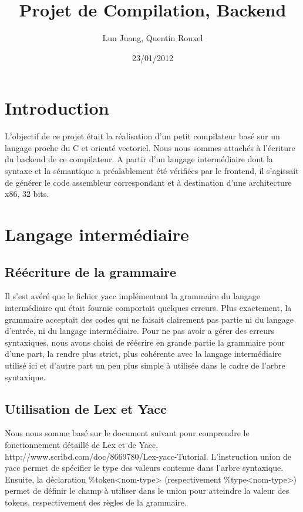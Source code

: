 \documentclass[a4paper, 11pt]{article}
\title{Projet de Compilation, Backend}
\author{Lun Juang, Quentin Rouxel}
\date{23/01/2012}
\begin{document}
\maketitle{}

\section{Introduction}

L'objectif de ce projet était la réalisation d'un petit compilateur basé sur un langage proche du C et orienté vectoriel.
Nous nous sommes attachés à l'écriture du backend de ce compilateur. A partir d'un langage intermédiaire dont la syntaxe et la sémantique
a préalablement été vérifiées par le frontend, il s'agissait de générer le code assembleur correspondant et à destination d'une architecture
x86, 32 bits.

\section{Langage intermédiaire}

\subsection{Réécriture de la grammaire}

Il s'est avéré que le fichier yacc implémentant la grammaire du langage intermédiaire qui était fournie comportait quelques erreurs.
Plus exactement, la grammaire acceptait des codes qui ne faisait clairement pas partie ni du langage d'entrée, ni du langage intermédiaire.
Pour ne pas avoir a gérer des erreurs syntaxiques, nous avons choisi de réécrire en grande partie la grammaire 
pour d'une part, la rendre plus strict, plus cohérente avec la langage intermédiaire utilisé ici et d'autre part un peu plus simple à
utilisée dans le cadre de l'arbre syntaxique.

\subsection{Utilisation de Lex et Yacc}

Nous nous somme basé sur le document suivant pour comprendre le fonctionnement détaillé de Lex et de Yacc. 
http://www.scribd.com/doc/8669780/Lex-yacc-Tutorial.
L'instruction union de yacc permet de spécifier le type des valeurs contenue dans l'arbre syntaxique. Ensuite, la déclaration
\%token<nom-type> (respectivement \%type<nom-type>) permet de définir le champ à utiliser dans le union pour atteindre la valeur des tokens, 
respectivement des règles de la grammaire.
\end{document}
